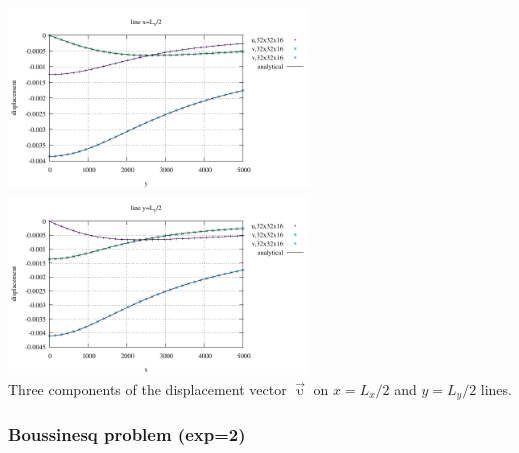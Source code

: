 \begin{center}
\includegraphics[width=8cm]{python_codes/fieldstone_123/results/exp1/xprofile.pdf} 
\includegraphics[width=8cm]{python_codes/fieldstone_123/results/exp1/yprofile.pdf} \\
{\captionfont Three components of the displacement vector $\vec{\upupsilon}$
on $x=L_x/2$ and $y=L_y/2$ lines.}
\end{center}

\subsubsection*{Boussinesq problem (exp=2)}





